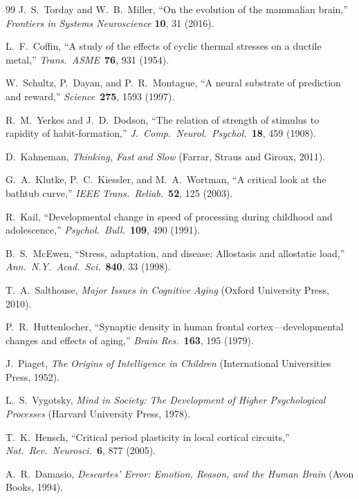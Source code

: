 \documentclass[aps,pre,twocolumn,superscriptaddress,floatfix]{revtex4-2}
\begin{document}
\begin{thebibliography}{99}
J.~S.~Torday and W.~B.~Miller,
``On the evolution of the mammalian brain,''
\emph{Frontiers in Systems Neuroscience} \textbf{10}, 31 (2016).

L.~F.~Coffin,
``A study of the effects of cyclic thermal stresses
on a ductile metal,''
\emph{Trans.\ ASME}\ \textbf{76}, 931 (1954).

W.~Schultz, P.~Dayan, and P.~R.~Montague,
``A neural substrate of prediction and reward,''
\emph{Science}\ \textbf{275}, 1593 (1997).

R.~M.~Yerkes and J.~D.~Dodson,
``The relation of strength of stimulus to rapidity
of habit-formation,''
\emph{J.\ Comp.\ Neurol.\ Psychol.}\ \textbf{18}, 459 (1908).

D.~Kahneman,
\emph{Thinking, Fast and Slow}
(Farrar, Straus and Giroux, 2011).

G.~A.~Klutke, P.~C.~Kiessler, and M.~A.~Wortman,
``A critical look at the bathtub curve,''
\emph{IEEE Trans.\ Reliab.}\ \textbf{52}, 125 (2003).

R.~Kail,
``Developmental change in speed of processing during childhood
and adolescence,''
\emph{Psychol.\ Bull.}\ \textbf{109}, 490 (1991).

B.~S.~McEwen,
``Stress, adaptation, and disease: Allostasis and allostatic load,''
\emph{Ann.\ N.Y.\ Acad.\ Sci.}\ \textbf{840}, 33 (1998).

T.~A.~Salthouse,
\emph{Major Issues in Cognitive Aging}
(Oxford University Press, 2010).

P.~R.~Huttenlocher,
``Synaptic density in human frontal cortex---developmental
changes and effects of aging,''
\emph{Brain Res.}\ \textbf{163}, 195 (1979).

J.~Piaget,
\emph{The Origins of Intelligence in Children}
(International Universities Press, 1952).

L.~S.~Vygotsky,
\emph{Mind in Society: The Development of Higher
Psychological Processes}
(Harvard University Press, 1978).

T.~K.~Hensch,
``Critical period plasticity in local cortical circuits,''
\emph{Nat.\ Rev.\ Neurosci.}\ \textbf{6}, 877 (2005).

A.~R.~Damasio,
\emph{Descartes' Error: Emotion, Reason, and the Human Brain}
(Avon Books, 1994).


\end{thebibliography}
\end{document}
